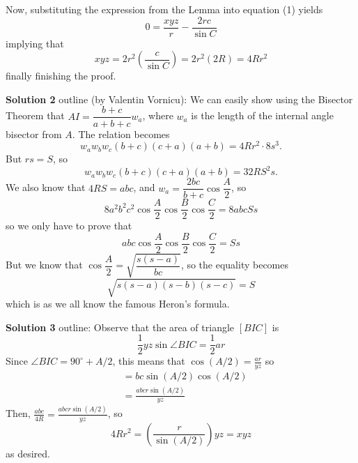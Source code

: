 \begin{mdsoln}
Now, substituting the expression from the Lemma into equation (1) yields
\[
0 = \frac {xyz}{r} - \frac {2rc}{\sin C}
\]implying that
\[
xyz = 2r^2\left(\frac {c}{\sin C}\right) = 2r^2(2R) = 4Rr^2
\]finally finishing the proof.

\vspace{10pt}
\textbf{Solution 2} outline (by Valentin Vornicu):
We can easily show using the Bisector Theorem that $AI = \dfrac {b + c}{a + b + c} w_a$, where $w_a$ is the length of the internal angle bisector from $A$. The relation becomes
\[
w_a w_b w_c (b + c)(c + a)(a + b) = 4Rr^2 \cdot 8s^3 .
\]But $rs = S$, so
\[
w_a w_b w_c (b + c)(c + a)(a + b) = 32 R S^2 s.
\]We also know that $4RS = abc$, and $w_a = \dfrac {2bc}{b + c} \cos \dfrac A2$, so
\[
8a^2b^2c^2 \cos \dfrac A2 \cos \dfrac B2 \cos \dfrac C2 = 8 abc Ss
\]so we only have to prove that
\[
abc \cos \dfrac A2 \cos \dfrac B2 \cos \dfrac C2 = Ss
\]But we know that $\cos \dfrac A2 = \sqrt {\dfrac {s(s - a)}{bc} }$, so the equality becomes
\[
\sqrt { s(s - a)(s - b)(s - c) } = S
\]which is as we all know the famous Heron's formula.

\vspace{10pt}

\textbf{Solution 3} outline:
Observe that the area of triangle $[BIC]$ is
\[
\frac {1}{2}yz\sin \angle BIC = \frac {1}{2}ar
\]Since $\angle BIC = 90^\circ + A/2$, this means that $\cos (A/2) = \frac {ar}{yz}$ so
\begin{align*}[ABC] & =  bc\sin(A/2)\cos(A/2) \\
& =  \frac {abcr\sin(A/2)}{yz}\end{align*}Then, $\frac {abc}{4R}  =  \frac {abcr\sin(A/2)}{yz}$, so
\[
4Rr^2 = \left(\frac {r}{\sin(A/2)}\right)yz = xyz
\]as desired.

\end{mdsoln}

